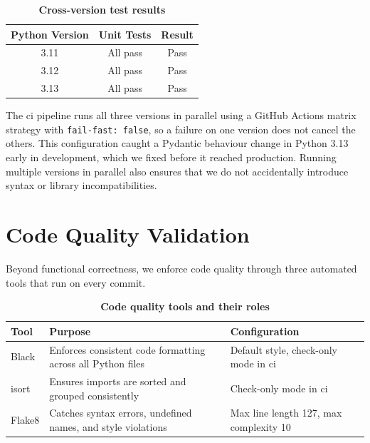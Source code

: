\begin{table}[htb]
\centering
\renewcommand{\arraystretch}{1.3}
\setlength{\arrayrulewidth}{0.5mm}
\fontsize{10}{12}\selectfont
\caption[Cross-version test results]{\textbf{Cross-version test results}}
\vspace{2mm}
\label{tab:crossversion}
\begin{tabular}{|c|c|c|}
\hline
\textbf{Python Version} & \textbf{Unit Tests} & \textbf{Result} \\
\hline
3.11 & All pass & Pass \\
\hline
3.12 & All pass & Pass \\
\hline
3.13 & All pass & Pass \\
\hline
\end{tabular}
\end{table}

The \gls{ci} pipeline runs all three versions in parallel using a GitHub Actions matrix strategy with \texttt{fail-fast: false}, so a failure on one version does not cancel the others. This configuration caught a Pydantic behaviour change in Python 3.13 early in development, which we fixed before it reached production. Running multiple versions in parallel also ensures that we do not accidentally introduce syntax or library incompatibilities.

\section{Code Quality Validation}

Beyond functional correctness, we enforce code quality through three automated tools that run on every commit.

\begin{table}[htb]
\centering
\renewcommand{\arraystretch}{1.3}
\setlength{\arrayrulewidth}{0.5mm}
\fontsize{10}{12}\selectfont
\caption[Code quality tools and their roles]{\textbf{Code quality tools and their roles}}
\vspace{2mm}
\label{tab:codequality}
\begin{tabular}{|p{2.5cm}|p{5cm}|p{4cm}|}
\hline
\textbf{Tool} & \textbf{Purpose} & \textbf{Configuration} \\
\hline
Black & Enforces consistent code formatting across all Python files & Default style, check-only mode in \gls{ci} \\
\hline
isort & Ensures imports are sorted and grouped consistently & Check-only mode in \gls{ci} \\
\hline
Flake8 & Catches syntax errors, undefined names, and style violations & Max line length 127, max complexity 10 \\
\hline
\end{tabular}
\end{table}

